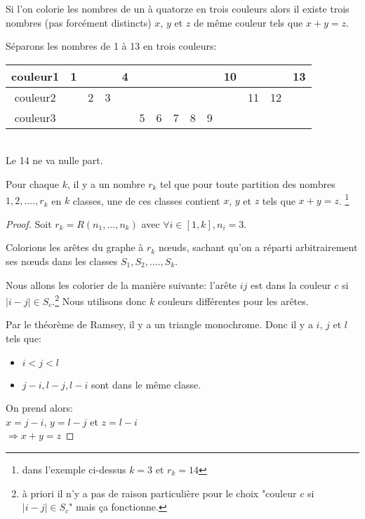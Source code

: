     
    
\begin{mytheo} 
    Si l'on colorie les nombres de un à quatorze en trois couleurs alors il existe trois nombres (pas forcément distincts) $x$, $y$ et $z$ de m\^eme couleur tels que $x+y=z$.
\end{mytheo}
 
\begin{myexem}   
Séparons les nombres de 1 à 13 en trois couleurs:
    
    \begin{tabular}{|c|c|c|c|c|c|c|c|c|c|c|c|c|c|}
        \hline
       couleur1 & 1 &  &  & 4  &  &  &  &  &  & 10 &  &  & 13\\
       
       \hline
       couleur2 &  & 2 & 3 &  &  &  &  &  &  &  & 11 & 12 &\\
       
       \hline
       couleur3 &  &  &  &  & 5 & 6 & 7 & 8 & 9 &  &  &  &\\
  
        \hline
      \end{tabular} \\
      Le 14 ne va nulle part.
\end{myexem}
      
      
\begin{mytheo}  
Pour chaque $k$, il y a un nombre $r_k$ tel que pour toute partition des nombres $1,2,....,r_k$ en $k$ classes, une de ces classes contient $x$, $y$ et $z$ tels que $x+y=z$. \footnote{dans l'exemple ci-dessus $k = 3$ et $r_k = 14$}
\begin{proof}
Soit $r_k = R(n_1,...,n_k)$ avec $\forall i \in [1 , k], n_i = 3 $.

Colorions les ar\^etes du graphe à $r_k$ nœuds, sachant qu'on a réparti arbitrairement ses nœuds dans les classes $S_1 ,S_2,....,S_k$.

Nous allons les colorier de la manière suivante: l'ar\^ete $ij$ est dans la couleur $c$ si $\mid i-j \mid \in S_c $.\footnote{à priori il n'y a pas de raison particulière pour le choix "couleur $c$ si $\mid i-j \mid \in S_c $" mais ça fonctionne.} Nous utilisons donc $k$ couleurs différentes pour les arêtes.

Par le théorème de Ramsey, il y a un triangle monochrome.
Donc il y a $i$, $j$ et $l$ tels que:
\begin{itemize}
\item
$i < j < l$
\item
$j-i, l-j, l-i$ sont dans le m\^eme classe.\\      
\end{itemize}
      
On prend alors:\\
$x = j-i$, $y = l-j$ et $z = l-i$\\
$\Rightarrow x+y=z$

\end{proof}
\end{mytheo}


